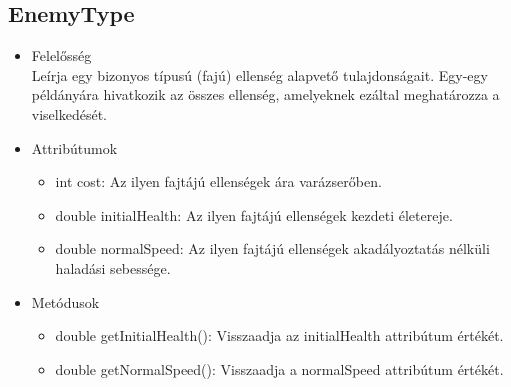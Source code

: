 \subsection{EnemyType}
\begin{itemize}
\item Felelősség\\
Leírja egy bizonyos típusú (fajú) ellenség alapvető tulajdonságait. Egy-egy példányára hivatkozik az összes ellenség, amelyeknek ezáltal meghatározza a viselkedését.
\item Attribútumok
	\begin{itemize}
		\item int cost: Az ilyen fajtájú ellenségek ára varázserőben.
		\item double initialHealth: Az ilyen fajtájú ellenségek kezdeti életereje.
		\item double normalSpeed: Az ilyen fajtájú ellenségek akadályoztatás nélküli haladási sebessége.
	\end{itemize}
\item Metódusok
	\begin{itemize}
		\item double getInitialHealth(): Visszaadja az initialHealth attribútum értékét.
		\item double getNormalSpeed(): Visszaadja a normalSpeed attribútum értékét.
	\end{itemize}
\end{itemize}




